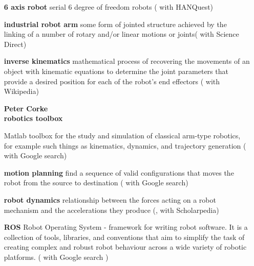 	\begin{itemize} [leftmargin=3cm]
		\item [\textbf{6 axis robot}] serial 6 degree of freedom robots (\cite{6axisRobot} with HANQuest)
		\item [\textbf{industrial robot arm}]  some form of jointed structure  achieved by the linking of a number of rotary and/or linear motions or joints( \cite{IndustrialRobotArm} with Science Direct)
		\item [\textbf{inverse kinematics}]  mathematical process of recovering the movements of an object with kinematic equations to determine the joint parameters that provide a desired position for each of the robot's end effectors (\cite{InvKinDef} with Wikipedia)
		\item[{\parbox[t]{0.25\linewidth}{\textbf{Peter Corke \\ robotics toolbox}}}] \parbox[t]{1\linewidth}{Matlab toolbox for the study and simulation of classical arm-type robotics, for example such things as kinematics, dynamics, and  trajectory generation (\cite{CorkeRoboticsToolbox} with Google search)}
		\item [\textbf{motion planning}]  find a sequence of valid configurations that moves the robot from the source to destination (\cite{MotionPlanning} with Google search)
		\item [\textbf{robot dynamics}] relationship between the forces acting on a robot mechanism and the accelerations they produce (\cite{RobotDynamics}, with Scholarpedia)
		\item [\textbf{ROS}] Robot Operating System - framework for writing robot software. It is a collection of tools, libraries, and conventions that aim to simplify the task of creating complex and robust robot behaviour across a wide variety of robotic platforms. (\cite{ROS} with Google search )
\end{itemize} 
\medskip

